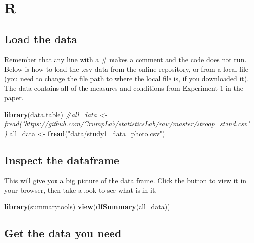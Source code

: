 \documentclass[
]{book}
\newenvironment{Shaded}{\begin{snugshade}}{\end{snugshade}}
\newcommand{\CommentTok}[1]{\textcolor[rgb]{0.56,0.35,0.01}{\textit{#1}}}
\newcommand{\FunctionTok}[1]{\textcolor[rgb]{0.13,0.29,0.53}{\textbf{#1}}}
\newcommand{\NormalTok}[1]{#1}
\newcommand{\OtherTok}[1]{\textcolor[rgb]{0.56,0.35,0.01}{#1}}
\newcommand{\StringTok}[1]{\textcolor[rgb]{0.31,0.60,0.02}{#1}}
\begin{document}
\hypertarget{r-10}{%
\section{R}\label{r-10}}

\hypertarget{load-the-data-5}{%
\subsection{Load the data}\label{load-the-data-5}}

Remember that any line with a \# makes a comment and the code does not run. Below is how to load the .csv data from the online repository, or from a local file (you need to change the file path to where the local file is, if you downloaded it). The data contains all of the measures and conditions from Experiment 1 in the paper.

\begin{Shaded}
\begin{Highlighting}[]
\FunctionTok{library}\NormalTok{(data.table)}
\CommentTok{\#all\_data \textless{}{-} fread("https://github.com/CrumpLab/statisticsLab/raw/master/stroop\_stand.csv")}
\NormalTok{all\_data }\OtherTok{\textless{}{-}} \FunctionTok{fread}\NormalTok{(}\StringTok{"data/study1\_data\_photo.csv"}\NormalTok{)}
\end{Highlighting}
\end{Shaded}

\hypertarget{inspect-the-dataframe-3}{%
\subsection{Inspect the dataframe}\label{inspect-the-dataframe-3}}

This will give you a big picture of the data frame. Click the button to view it in your browser, then take a look to see what is in it.

\begin{Shaded}
\begin{Highlighting}[]
\FunctionTok{library}\NormalTok{(summarytools)}
\FunctionTok{view}\NormalTok{(}\FunctionTok{dfSummary}\NormalTok{(all\_data))}
\end{Highlighting}
\end{Shaded}

\hypertarget{get-the-data-you-need-3}{%
\subsection{Get the data you need}\label{get-the-data-you-need-3}}
\end{document}
